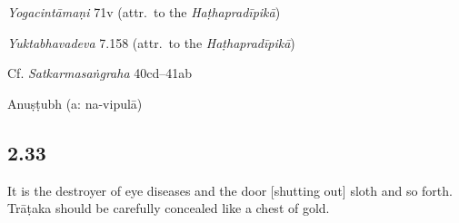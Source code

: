 \begin{ekdosis}
\begin{testimonia}[hp02_032]
\emph{Yogacintāmaṇi} 71v (attr.~to the \emph{Haṭhapradīpikā})

\begin{versinnote}
\end{versinnote}

\emph{Yuktabhavadeva} 7.158 (attr.~to the \emph{Haṭhapradīpikā})

\begin{versinnote}
\end{versinnote}

Cf. \emph{Satkarmasaṅgraha} 40cd–41ab

\begin{versinnote}
\end{versinnote}

\end{testimonia}



\begin{metre}[hp02_032]
Anuṣṭubh (a: na-vipulā)
\end{metre}

\subsection*{2.33}
\begin{translation}[hp02_033]
It is the destroyer of eye diseases and the door [shutting out] sloth and so forth. Trāṭaka should be carefully concealed like a chest of gold.
\end{translation}



\end{ekdosis}
